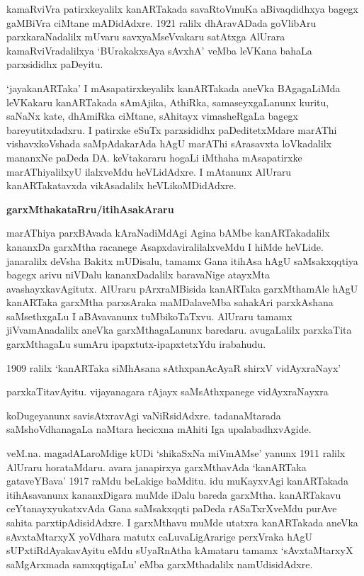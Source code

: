 \documentclass[11pt,a4size]{article}
\begin{document}
kamaRviVra patirxkeyalilx kanARTakada savaRtoVmuKa aBivaqdidhxya
bagegx gaMBiVra ciMtane mADidAdxre. 1921 ralilx dhAravADada goVlibAru
parxkaraNadalilx mUvaru savxyaMseVvakaru satAtxga AlUrara
kamaRviVradalilxya `BUrakakxsAya sAvxhA' veMba leVKana bahaLa
parxsididhx paDeyitu.

`jayakanARTaka' I mAsapatirxkeyalilx kanARTakada aneVka BAgagaLiMda
leVKakaru kanARTakada sAmAjika, AthiRka, samaseyxgaLanunx kuritu,
saNaNx kate, dhAmiRka ciMtane, sAhitayx vimasheRgaLa bagegx
bareyutitxdadxru. I patirxke eSuTx parxsididhx paDeditetxMdare marAThi
vishavxkoVshada saMpAdakarAda hAgU marAThi sArasavxta loVkadalilx
mananxNe paDeda DA. keVtakararu hogaLi iMthaha mAsapatirxke
marAThiyalilxyU ilalxveMdu heVLidAdxre. I mAtanunx AlUraru
kanARTakatavxda vikAsadalilx heVLikoMDidAdxre.

\bigskip
\centerline{\textbf{\Large{garxMthakataRru/itihAsakAraru}}}
\medskip

marAThiya parxBAvada kAraNadiMdAgi Agina bAMbe kanARTakadalilx
kananxDa garxMtha racanege AsapxdaviralilalxveMdu I hiMde
heVLide. janaralilx deVsha Bakitx mUDisalu, tamamx Gana itihAsa hAgU
saMsakxqqtiya bagegx arivu niVDalu kananxDadalilx baravaNige atayxMta
avashayxkavAgitutx. AlUraru pArxraMBisida kanARTaka garxMthamAle hAgU
kanARTaka garxMtha parxsAraka maMDalaveMba sahakAri parxkAshana
saMsethxgaLu I aBAvavanunx tuMbikoTaTxvu. AlUraru tamamx
jiVvamAnadalilx aneVka garxMthagaLanunx baredaru. avugaLalilx
parxkaTita garxMthagaLu sumAru ipapxtutx-ipapxtetxYdu irabahudu.

1909 ralilx `kanARTaka siMhAsana sAthxpanAcAyaR shirxV vidAyxraNayx'

parxkaTitavAyitu. vijayanagara rAjayx saMsAthxpanege vidAyxraNayxra

koDugeyanunx savisAtxravAgi vaNiRsidAdxre. tadanaMtarada
saMshoVdhanagaLa naMtara he\-cicxna mAhiti Iga upalabadhxvAgide.

veM.na. magadALaroMdige kUDi `shikaSxNa miVmAMse' yanunx 1911 ralilx
AlUraru horataMdaru.
avara janapirxya garxMthavAda `kanARTaka gataveYBava' 1917 raMdu
beLakige baMditu. idu muKayxvAgi kanARTakada itihAsavanunx
kananxDigara muMde iDalu bareda garxMtha. kanARTakavu
ceYtanayxyukatxvAda Gana saMsakxqqti paDeda rASaTxrXveMdu purAve
sahita parxtipAdisidAdxre. I garxMthavu muMde utatxra kanARTakada
aneVka sAvxtaMtarxyX yoVdhara matutx caLuvaLigArarige perxVraka hAgU
sUPxtiRdAyakavAyitu eMdu sUyaRnAtha kAmataru tamamx `sAvxtaMtarxyX
saMgArxmada samxqqtigaLu' eMba garxMthadalilx namUdisidAdxre.
\end{document}
